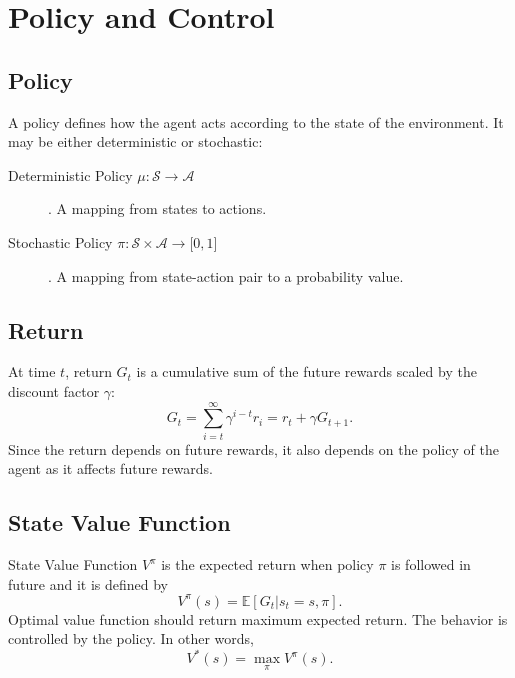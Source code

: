 \section{Policy and Control}
\label{sec:policy_control}

\subsection{Policy}

A policy defines how the agent acts according to the state of the environment. 
It may be either deterministic or stochastic: 

\begin{description}
	\item[Deterministic Policy $\mu \colon \mathcal{S} \rightarrow \mathcal{A}$]. 
	A mapping from states to actions.
	\item[Stochastic Policy $\pi \colon \mathcal{S} \times \mathcal{A} \rightarrow \lbrack 0,1 \rbrack$]. 
	A mapping from state-action pair to a probability value.
\end{description}

\subsection{Return}

At time $t$, return $G_t$ is a cumulative sum of the future rewards scaled by the discount factor $\gamma$: 
\begin{equation}
\label{eqn:return_dfn}
G_t = \sum_{i=t}^{\infty} \gamma^{i-t} r_i = r_t + \gamma G_{t+1}.
\end{equation}
Since the return depends on future rewards, it also depends on the  policy of the agent as it affects future rewards.

\subsection{State Value Function}

State Value Function $V^{\pi}$ is the expected return when policy $\pi$ is followed in future and it is defined by
\begin{equation}
V^{\pi}(s) = \mathbb{E}[G_t|s_t=s, \pi]. %
\end{equation}
Optimal value function should return maximum expected return. 
The behavior is controlled by the policy. In other words, 
\begin{equation}
V^{*}(s) = \max_{\pi} V^{\pi}(s).
\end{equation}


